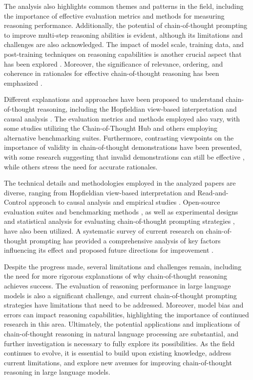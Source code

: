 \documentclass[conference]{IEEEtran}
\begin{document}
The analysis also highlights common themes and patterns in the field, including the importance of effective evaluation metrics and methods for measuring reasoning performance. Additionally, the potential of chain-of-thought prompting to improve multi-step reasoning abilities is evident, although its limitations and challenges are also acknowledged. The impact of model scale, training data, and post-training techniques on reasoning capabilities is another crucial aspect that has been explored \cite{b2}. Moreover, the significance of relevance, ordering, and coherence in rationales for effective chain-of-thought reasoning has been emphasized \cite{b4}.

Different explanations and approaches have been proposed to understand chain-of-thought reasoning, including the Hopfieldian view-based interpretation \cite{b1} and causal analysis \cite{b2}. The evaluation metrics and methods employed also vary, with some studies utilizing the Chain-of-Thought Hub \cite{b3} and others employing alternative benchmarking suites. Furthermore, contrasting viewpoints on the importance of validity in chain-of-thought demonstrations have been presented, with some research suggesting that invalid demonstrations can still be effective \cite{b4}, while others stress the need for accurate rationales.

The technical details and methodologies employed in the analyzed papers are diverse, ranging from Hopfieldian view-based interpretation and Read-and-Control approach \cite{b1} to causal analysis and empirical studies \cite{b2}. Open-source evaluation suites and benchmarking methods \cite{b3}, as well as experimental designs and statistical analysis for evaluating chain-of-thought prompting strategies \cite{b4}, have also been utilized. A systematic survey of current research on chain-of-thought prompting has provided a comprehensive analysis of key factors influencing its effect and proposed future directions for improvement \cite{b5}.

Despite the progress made, several limitations and challenges remain, including the need for more rigorous explanations of why chain-of-thought reasoning achieves success. The evaluation of reasoning performance in large language models is also a significant challenge, and current chain-of-thought prompting strategies have limitations that need to be addressed. Moreover, model bias and errors can impact reasoning capabilities, highlighting the importance of continued research in this area. Ultimately, the potential applications and implications of chain-of-thought reasoning in natural language processing are substantial, and further investigation is necessary to fully explore its possibilities. As the field continues to evolve, it is essential to build upon existing knowledge, address current limitations, and explore new avenues for improving chain-of-thought reasoning in large language models.
\end{document}
